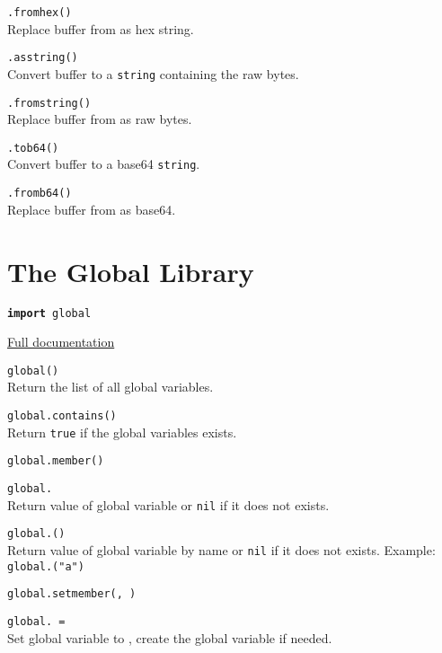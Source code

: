 \hangpar {}\texttt{.fromhex(}\texttt{)}\\
Replace  buffer from  as hex string.

\hangpar {}\texttt{.asstring()}\\
Convert  buffer to a \texttt{string} containing the raw bytes.

\hangpar {}\texttt{.fromstring(}\texttt{)}\\
Replace  buffer from  as raw bytes.

\hangpar {}\texttt{.tob64()}\\
Convert  buffer to a base64 \texttt{string}.

\hangpar {}\texttt{.fromb64(}\texttt{)}\\
Replace  buffer from  as base64.

\section*{The Global Library}

\hangpar \texttt{\textbf{import} global}

\hangpar \href{https://github.com/berry-lang/berry/wiki/Chapter-7\#module-global}{Full documentation}

\hangpar \texttt{global()}\\
Return the list of all global variables.

\hangpar \texttt{global.contains(}\texttt{)} \\
Return \texttt{true} if the global variables exists.

\hangpar \texttt{global.member(}\texttt{)}

\hangpar \texttt{global.} \\	
Return value of global variable  or \texttt{nil} if it does not exists.

\hangpar \texttt{global.(}\texttt{)} \\
Return value of global variable  by name or \texttt{nil} if it does not exists. Example: \texttt{global.("a")}

\hangpar \texttt{global.setmember(}\texttt{, }\texttt{)}

\hangpar \texttt{global.}\texttt{ = } \\
Set global variable  to , create the global variable if needed.

